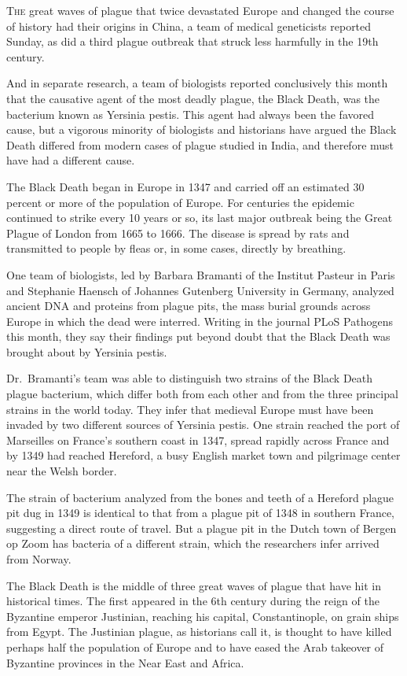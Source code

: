 ﻿\documentclass[12pt]{article}
\begin{document}
\lettrine{T}{he} great waves of plague that twice devastated Europe and
changed the course of history had their origins in China, a team of medical geneticists reported
Sunday, as did a third plague outbreak that struck less harmfully in the 19th century.

And in separate research, a team of biologists reported conclusively this month that the causative
agent of the most deadly plague, the Black Death, was the bacterium known as Yersinia pestis. This
agent had always been the favored cause, but a vigorous minority of biologists and historians have
argued the Black Death differed from modern cases of plague studied in India, and therefore must
have had a different cause.

The Black Death began in Europe in 1347 and carried off an estimated 30 percent or more of the
population of Europe. For centuries the epidemic continued to strike every 10 years or so, its last
major outbreak being the Great Plague of London from 1665 to 1666. The disease is spread by rats and
transmitted to people by fleas or, in some cases, directly by breathing.

One team of biologists, led by Barbara Bramanti of the Institut Pasteur in Paris and Stephanie
Haensch of Johannes Gutenberg University in Germany, analyzed ancient DNA and proteins from plague
pits, the mass burial grounds across Europe in which the dead were interred. Writing in the journal
PLoS Pathogens this month, they say their findings put beyond doubt that the Black Death was brought
about by Yersinia pestis.

Dr.~Bramanti's team was able to distinguish two strains of the Black Death plague bacterium, which
differ both from each other and from the three principal strains in the world today. They infer that
medieval Europe must have been invaded by two different sources of Yersinia pestis. One strain
reached the port of Marseilles on France's southern coast in 1347, spread rapidly across France and
by 1349 had reached Hereford, a busy English market town and pilgrimage center near the Welsh
border.

The strain of bacterium analyzed from the bones and teeth of a Hereford plague pit dug in 1349 is
identical to that from a plague pit of 1348 in southern France, suggesting a direct route of travel.
But a plague pit in the Dutch town of Bergen op Zoom has bacteria of a different strain, which the
researchers infer arrived from Norway.

The Black Death is the middle of three great waves of plague that have hit in historical times. The
first appeared in the 6th century during the reign of the Byzantine emperor Justinian, reaching his
capital, Constantinople, on grain ships from Egypt. The Justinian plague, as historians call it, is
thought to have killed perhaps half the population of Europe and to have eased the Arab takeover of
Byzantine provinces in the Near East and Africa.
\end{document}
